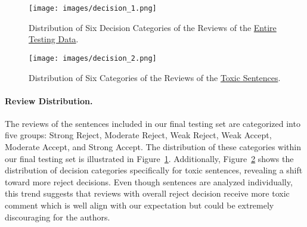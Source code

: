 

\begin{figure}[h]
    \centering
    \texttt{[image: images/decision\_1.png]}
    \caption{Distribution of Six Decision Categories of the Reviews of the \underline{Entire Testing Data}.}
    \label{fig:review_categories_1}
\end{figure}

\begin{figure}[h]
    \centering
    \texttt{[image: images/decision\_2.png]}
    \caption{Distribution of Six Categories of the Reviews of the \underline{Toxic Sentences}.}
    \label{fig:review_categories_2}
\end{figure}

\paragraph{Review Distribution.}


The reviews of the sentences included in our final testing set are categorized into five groups: Strong Reject, Moderate Reject, Weak Reject, Weak Accept, Moderate Accept, and Strong Accept. The distribution of these categories within our final testing set is illustrated in Figure~\ref{fig:review_categories_1}. Additionally, Figure~\ref{fig:review_categories_2} shows the distribution of decision categories specifically for toxic sentences, revealing a shift toward more reject decisions. Even though sentences are analyzed individually, this trend suggests that reviews with overall reject decision receive more toxic comment which is well align with our expectation but could be extremely discouraging for the authors.

